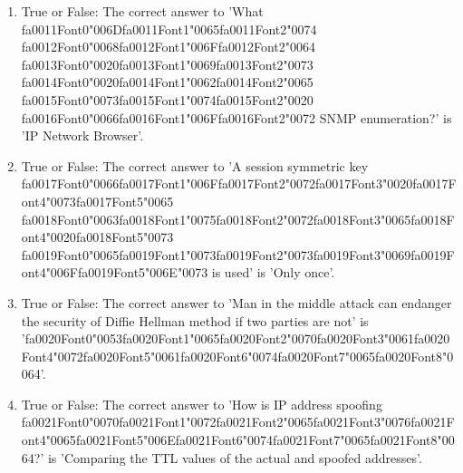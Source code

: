 \documentclass[12pt]{article}
\begin{document}
\begin{enumerate}[label=\arabic*.]
\item True or False: The correct answer to 'What {\csname fa0011Font0\endcsname\char"006D}{\csname fa0011Font1\endcsname\char"0065}{\csname fa0011Font2\endcsname\char"0074} {\csname fa0012Font0\endcsname\char"0068}{\csname fa0012Font1\endcsname\char"006F}{\csname fa0012Font2\endcsname\char"0064} {\csname fa0013Font0\endcsname\char"0020}{\csname fa0013Font1\endcsname\char"0069}{\csname fa0013Font2\endcsname\char"0073} {\csname fa0014Font0\endcsname\char"0020}{\csname fa0014Font1\endcsname\char"0062}{\csname fa0014Font2\endcsname\char"0065} {\csname fa0015Font0\endcsname\char"0073}{\csname fa0015Font1\endcsname\char"0074}{\csname fa0015Font2\endcsname\char"0020} {\csname fa0016Font0\endcsname\char"0066}{\csname fa0016Font1\endcsname\char"006F}{\csname fa0016Font2\endcsname\char"0072} SNMP enumeration?' is 'IP Network Browser'.
\item True or False: The correct answer to 'A session symmetric key {\csname fa0017Font0\endcsname\char"0066}{\csname fa0017Font1\endcsname\char"006F}{\csname fa0017Font2\endcsname\char"0072}{\csname fa0017Font3\endcsname\char"0020}{\csname fa0017Font4\endcsname\char"0073}{\csname fa0017Font5\endcsname\char"0065} {\csname fa0018Font0\endcsname\char"0063}{\csname fa0018Font1\endcsname\char"0075}{\csname fa0018Font2\endcsname\char"0072}{\csname fa0018Font3\endcsname\char"0065}{\csname fa0018Font4\endcsname\char"0020}{\csname fa0018Font5\endcsname\char"0073} {\csname fa0019Font0\endcsname\char"0065}{\csname fa0019Font1\endcsname\char"0073}{\csname fa0019Font2\endcsname\char"0073}{\csname fa0019Font3\endcsname\char"0069}{\csname fa0019Font4\endcsname\char"006F}{\csname fa0019Font5\endcsname\char"006E}{\char"0073} is used' is 'Only once'.
\item True or False: The correct answer to 'Man in the middle attack can endanger the security of Diffie Hellman method if two parties are not' is '{\csname fa0020Font0\endcsname\char"0053}{\csname fa0020Font1\endcsname\char"0065}{\csname fa0020Font2\endcsname\char"0070}{\csname fa0020Font3\endcsname\char"0061}{\csname fa0020Font4\endcsname\char"0072}{\csname fa0020Font5\endcsname\char"0061}{\csname fa0020Font6\endcsname\char"0074}{\csname fa0020Font7\endcsname\char"0065}{\csname fa0020Font8\endcsname\char"0064}'.
\item True or False: The correct answer to 'How is IP address spoofing {\csname fa0021Font0\endcsname\char"0070}{\csname fa0021Font1\endcsname\char"0072}{\csname fa0021Font2\endcsname\char"0065}{\csname fa0021Font3\endcsname\char"0076}{\csname fa0021Font4\endcsname\char"0065}{\csname fa0021Font5\endcsname\char"006E}{\csname fa0021Font6\endcsname\char"0074}{\csname fa0021Font7\endcsname\char"0065}{\csname fa0021Font8\endcsname\char"0064}?' is 'Comparing the TTL values of the actual and spoofed addresses'.

\end{enumerate}
\end{document}
